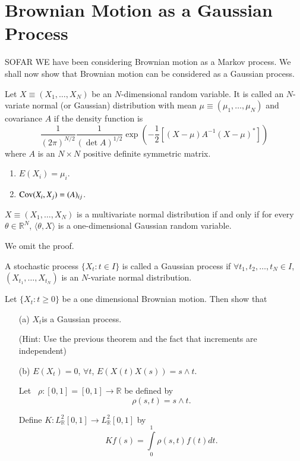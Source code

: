 \chapter{Brownian Motion as a Gaussian Process}\label{chap14}

SO\pageoriginale FAR WE have been considering Brownian motion as a
Markov process. We shall now show that Brownian motion can be
considered as a Gaussian process.

\begin{defi*}
Let $X\equiv (X_{1},\ldots,X_{N})$ be an $N$-dimensional random
variable. It is called an $N$-variate normal (or Gaussian)
distribution with mean $\mu\equiv (\mu_{1},\ldots,\mu_{N})$ and
covariance $A$ if the density function is
$$
\frac{1}{(2\pi)^{N/2}}\frac{1}{(\det A)^{1/2}}\exp \left(-\frac{1}{2}[(X-\mu)A^{-1}(X-\mu)^{*}]\right)
$$
where $A$ is an $N\times N$ positive definite symmetric matrix.
\end{defi*}

\begin{note*}
\begin{enumerate}
\item $E(X_{i})=\mu_{i}$.

\item $\operatorname{Cov} (X_{i},X_{j})=(A)_{ij}$.
\end{enumerate}
\end{note*}

\begin{theorem*}
$X\equiv (X_{1},\ldots,X_{N})$ is a multivariate normal distribution
  if and only if for every $\theta\in \mathbb{R}^{N}$, $\langle
  \theta,X\rangle$ is a one-dimensional Gaussian random variable.
\end{theorem*}

We omit the proof.

\begin{defi*}
A stochastic process $\{X_{t}:t\in I\}$ is called a Gaussian process
if $\forall t_{1},t_{2},\ldots,t_{N}\in I$,
$(X_{t_{1}},\ldots,X_{t_{N}})$ is an $N$-variate normal distribution.
\end{defi*}

\setcounter{exercise}{0}
\begin{exercise}\label{chap14-exer1}
Let $\{X_{t}:t\geq 0\}$ be a one dimensional Brownian motion. Then
show that 
\begin{itemize}
\item[(a)] $X_{t}$\pageoriginale is a Gaussian process.

(Hint: Use the previous theorem and the fact that increments are
  independent)

\item[(b)] $E(X_{t})=0$, $\forall t$, $E(X(t)X(s))=s \wedge t$.

Let~ $\rho:[0,1]=[0,1]\to \mathbb{R}$ be defined by
$$
\rho(s,t)=s\wedge t.
$$

Define $K:L^{2}_{\mathbb{R}}[0,1]\to L^{2}_{\mathbb{R}}[0,1]$ by
$$
Kf(s)=\int\limits^{1}_{0}\rho(s,t)f(t)dt.
$$
\end{itemize}
\end{exercise}

